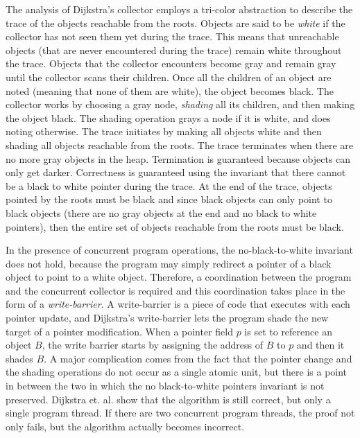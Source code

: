 The analysis of Dijkstra's collector employs a tri-color abstraction to describe the trace of the objects reachable from the roots.
Objects are said to be {\em white} if the collector has not seen them yet during the trace.
This means that unreachable objects (that are never encountered during the trace) remain white throughout the trace.
Objects that the collector encounters become gray and remain gray until the collector scans their children.
Once all the children of an object are noted (meaning that none of them are white), the object becomes black.
The collector works by choosing a gray node, {\em shading} all its children, and then making the object black.
The shading operation grays a node if it is white, and does noting otherwise.
The trace initiates by making all objects white and then shading all objects reachable from the roots.
The trace terminates when there are no more gray objects in the heap.
Termination is guaranteed because objects can only get darker.
Correctness is guaranteed using the invariant that there cannot be a black to white pointer during the trace.
At the end of the trace, objects pointed by the roots must be black and since black objects can only point to black objects
(there are no gray objects at the end and no black to white pointers),
then the entire set of objects reachable from the roots must be black.

In the presence of concurrent program operations,
the no-black-to-white invariant does not hold,
because the program may simply redirect a pointer of a black object to point to a white object.
Therefore, a coordination between the program and the concurrent collector is required
and this coordination takes place in the form of a {\em write-barrier}.
A write-barrier is a piece of code that executes with each pointer update,
and Dijkstra's write-barrier lets the program shade the new target of a pointer modification.
When a pointer field $p$ is set to reference an object $B$,
the write barrier starts by assigning the address of $B$ to $p$ and then it shades $B$.
A major complication comes from the fact that the pointer change and the shading operations do not occur as a single atomic unit,
but there is a point in between the two in which the no black-to-white pointers invariant is not preserved.
Dijkstra et. al. show that the algorithm is still correct,
but only a single program thread.
If there are two concurrent program threads, the proof not only fails, but the algorithm actually becomes incorrect. 


